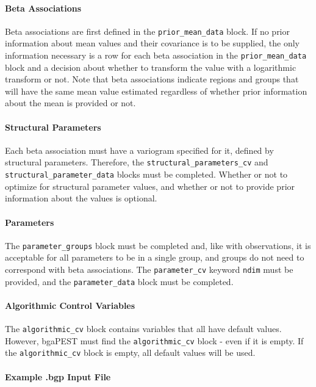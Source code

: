 \documentclass[11pt,oneside,onecolumn]{usgsreport}
\begin{document}
\begin{appendix}
\begin{bibunit}
\paragraph*{Beta Associations}

Beta associations are first defined in the \texttt{prior\_mean\_data}
block. If no prior information about mean values and their covariance
is to be supplied, the only information necessary is a row for each
beta association in the \texttt{prior\_mean\_data} block and a decision
about whether to transform the value with a logarithmic transform
or not. Note that beta associations indicate regions and groups that
will have the same mean value estimated regardless of whether prior
information about the mean is provided or not.


\paragraph*{Structural Parameters}

Each beta association must have a variogram specified for it, defined
by structural parameters. Therefore, the \texttt{structural\_parameters\_cv}
and \texttt{structural\_parameter\_data} blocks must be completed.
Whether or not to optimize for structural parameter values, and whether
or not to provide prior information about the values is optional.


\paragraph*{Parameters}

The \texttt{parameter\_groups} block must be completed and, like with
observations, it is acceptable for all parameters to be in a single
group, and groups do not need to correspond with beta associations.
The \texttt{parameter\_cv} keyword \texttt{ndim} must be provided,
and the \texttt{parameter\_data} block must be completed. 


\paragraph*{Algorithmic Control Variables}

The \texttt{algorithmic\_cv} block contains variables that all have
default values. However, bgaPEST must find the \texttt{algorithmic\_cv}
block - even if it is empty. If the \texttt{algorithmic\_cv} block
is empty, all default values will be used.


\paragraph*{Example .bgp Input File}


\end{bibunit}
\end{appendix}
\end{document}
